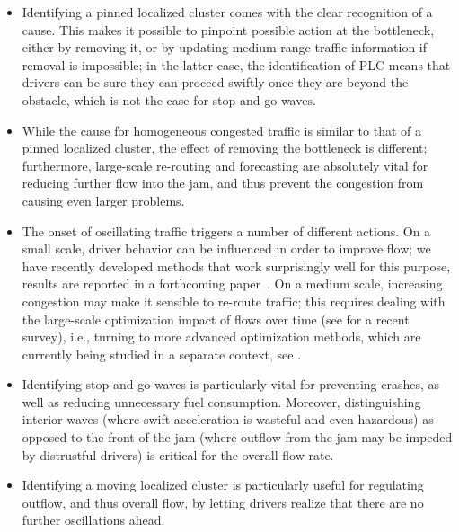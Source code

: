 \documentclass{acmrip}
\begin{document}
\begin{itemize}
\item Identifying a pinned localized cluster comes with the clear recognition
of a cause. This makes it possible to pinpoint possible action
at the bottleneck, either by removing it, or by updating
medium-range traffic information if removal is impossible; in the latter
case, the identification of PLC means that
drivers can be sure they can proceed swiftly once they are
beyond the obstacle, which is not the case for stop-and-go waves.
\item While the cause for homogeneous congested traffic is similar
to that of a pinned localized cluster, the effect of removing the
bottleneck is different; furthermore, large-scale re-routing and
forecasting are absolutely vital for reducing further flow
into the jam, and thus prevent the congestion from causing
even larger problems.
\item The onset of oscillating traffic triggers a number
of different actions. On a small scale, driver behavior can be
influenced in order to improve flow; we have recently developed
methods that work surprisingly well for this purpose, results are
reported in a forthcoming paper~\cite{fth+-ifct-08}. On a
medium scale, increasing congestion may make it sensible to re-route
traffic; this requires dealing with the large-scale optimization
impact of flows over time (see \cite{skut} for a recent survey),
i.e., turning to more advanced optimization methods, which are
currently being studied in a separate context, see \cite{advest}.
\item Identifying stop-and-go waves is
particularly vital for
preventing crashes, as well as reducing unnecessary fuel consumption.
Moreover, distinguishing interior waves (where swift acceleration is
wasteful and even hazardous) as opposed to the front of the jam (where
outflow from the jam may be impeded by distrustful drivers) is critical for
the overall flow rate.
\item Identifying a moving localized cluster is particularly useful
for regulating outflow, and thus overall flow, by letting drivers realize
that there are no further oscillations ahead.
\end{itemize}
\end{document}
